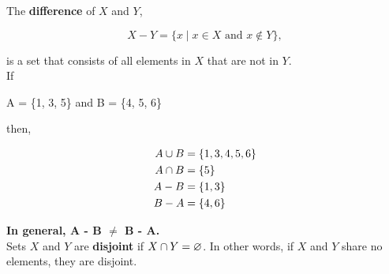 The \textbf{difference} of $X$ and $Y$,

\[
    X - Y = \{x \mid x \in X \text{ and } x \not\in Y\},
\]

is a set that consists of all elements in $X$ that are not in $Y$.\\

If

\begin{center}
A = \{1, 3, 5\} and B = \{4, 5, 6\}
\end{center}

then, 

\begin{align*}
    A \cup B &= \{1, 3, 4, 5, 6\}\\
    A \cap B &= \{5\}\\
    A - B &= \{1, 3\}\\
    B - A &= \{4, 6\}
\end{align*}

\textbf{In general, A - B $\neq$ B - A.}\\

Sets $X$ and $Y$ are \textbf{disjoint} if $X \cap Y = \varnothing$.  In other words, if $X$ and $Y$ share no elements, they are disjoint.




